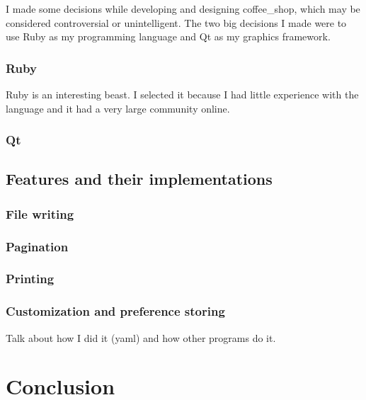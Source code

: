 \documentclass[11pt]{article}
\begin{document}
I made some decisions while developing and designing coffee\_shop, which may be considered controversial or unintelligent. The two big decisions I made were to use Ruby as my programming language and Qt as my graphics framework.

\subsubsection{Ruby}

Ruby is an interesting beast. I selected it because I had little experience with the language and it had a very large community online.

\subsubsection{Qt}

\subsection{Features and their implementations}

\subsubsection{File writing}

\subsubsection{Pagination}

\subsubsection{Printing}

\subsubsection{Customization and preference storing}

Talk about how I did it (yaml) and how other programs do it.

\section{Conclusion}

\newpage
\nocite{*}


\end{document}
